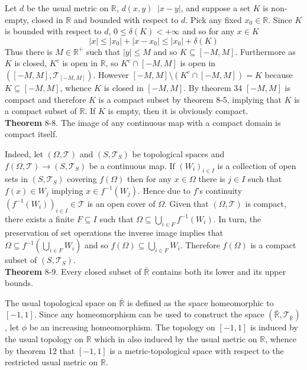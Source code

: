 \documentclass[a4paper]{article}
\newcommand{\clo}[1]{\left [ #1 \right ]}
\newcommand{\brac}[1]{\left ( #1 \right )}
\newcommand{\abs}[1]{\left | #1 \right |}
\newcommand{\Rbar}{{\bar{\mathbb{R}}}}
\newcommand{\Real}{\mathbb{R}}
\newcommand{\Tcal}{\mathcal{T}}
\newcommand{\defn}{\mathop{\overset{\Delta}{=}}\nolimits}
\begin{document}
Let $d$ be the usual metric on $\Real$, $d\brac{x,y}\defn \abs{x-y}$, and suppose a set $K$ is non-empty, closed in $\Real$ and bounded with respect to $d$. Pick any fixed $x_0\in \Real$. Since $K$ is bounded with respect to $d$, $0\leq\delta\brac{K}<+\infty$ and so for any $x\in K$ \[\abs{x}\leq \abs{x_0}+\abs{x-x_0}\leq \abs{x_0}+\delta\brac{K}\] Thus there is $M\in \Real^+$ such that $\abs{y}\leq M$ and so $K\subseteq \clo{-M,M}$. Furthermore as $K$ is closed, $K^c$ is open in $\Real$, so $K^c\cap \clo{-M,M}$ is open in $\brac{\clo{-M, M}, \Tcal_{\clo{-M, M}}}$. However $\clo{-M,M}\setminus \brac{K^c\cap \clo{-M,M}} = K$ because $K\subseteq \clo{-M,M}$, whence $K$ is closed in $\clo{-M, M}$. By theorem 34 $\clo{-M,M}$ is compact and therefore $K$ is a compact subset by theorem 8-5, implying that $K$ is a compact subset of $\Real$. If $K$ is empty, then it is obviously compact.\\

\label{thm:compact_image} \noindent \textbf{Theorem} 8-8.
The image of any continuous map with a compact domain is compact itself.

Indeed, let $\brac{\Omega, \Tcal}$ and $\brac{S, \Tcal_S}$ be topological spaces and $f\brac{\Omega, \Tcal}\to\brac{S, \Tcal_S}$ be a continuous map. If $\brac{W_i}_{i\in I}$ is a collection of open sets in $\brac{S, \Tcal_S}$ covering $f\brac{\Omega}$ then for any $x\in \Omega$ there is $j\in I$ such that $f\brac{x}\in W_j$ implying $x\in f^{-1}\brac{W_j}$. Hence due to $f$'s continuity $\brac{f^{-1}\brac{W_i}}_{i\in I}\in \Tcal$ is an open cover of $\Omega$. Given that $\brac{\Omega, \Tcal}$ is compact, there exists a finite $F\subseteq I$ such that $\Omega\subseteq\bigcup_{i\in F} f^{-1}\brac{W_i}$. In turn, the preservation of set operations the inverse image implies that $\Omega\subseteq f^{-1}\brac{\bigcup_{i\in F} W_i}$ and so $f\brac{\Omega}\subseteq \bigcup_{i\in F} W_i$. Therefore $f\brac{\Omega}$ is a compact subset of $\brac{S, \Tcal_S}$.\\

\label{thm:rbar_lpc} \noindent \textbf{Theorem} 8-9.
Every closed subset of $\Rbar$ contains both its lower and its upper bounds.

The usual topological space on $\Rbar$ is defined as the space homeomorphic to $\clo{-1, 1}$. Since any homeomorphism can be used to construct the space $\brac{\Rbar, \Tcal_\Rbar}$, let $\phi$ be an increasing homeomorphism. The topology on $\clo{-1,1}$ is induced by the usual topology on $\Real$ which in also induced by the usual metric on $\Real$, whence by theorem 12 that $\clo{-1,1}$ is a metric-topological space with respect to the restricted usual metric on $\Real$.
\end{document}
